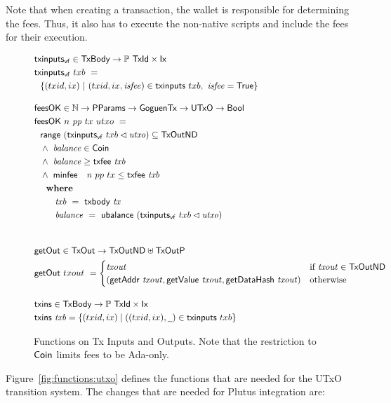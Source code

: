 Note that when creating a transaction, the wallet is responsible for
determining the fees. Thus, it also has to execute the non-native scripts
and include the fees for their execution.
\begin{figure}[htb]
  \begin{align*}
    & \fun{txinputs_{vf}} \in \TxBody \to \powerset{\TxId \times \Ix} \\
    & \fun{txinputs_{vf}} ~txb~= \\
    &~~\{ (txid,ix)~\vert~(txid,ix,\var{isfee}) \in
    \fun{txinputs} ~txb,~
     \var{isfee} = \True\}
    \nextdef
    & \fun{feesOK} \in \N \to \PParams \to \GoguenTx \to \UTxO \to \Bool  \\
    & \fun{feesOK} ~n~\var{pp}~tx~utxo~= \\
    &~~\fun{range}~(\fun{txinputs_{vf}}~{txb} \restrictdom \var{utxo}) \subseteq \TxOutND ~ \\
    &~~\wedge~ \var{balance} \in \Coin \\
    &~~      \wedge~ \var{balance} \geq \txfee{txb} ~ \\
    &~~      \wedge~ \minfee~n~{pp}~{tx} \leq \txfee{txb} \\
    &~~      \where \\
    & ~~~~~~~ \var{txb}~=~\txbody{tx} \\
    & ~~~~~~~ \var{balance}~=~\fun{ubalance}~(\fun{txinputs_{vf}}~{txb} \restrictdom \var{utxo}) \\
    \nextdef
    & \fun{getOut} \in \TxOut \to \TxOutND \uniondistinct \TxOutP \\
    & \fun{getOut} ~{txout}~= \begin{cases}
         \var{txout}  & \text{if~} \var{txout} \in \TxOutND \\
              (\fun{getAddr}~\var{txout}, \fun{getValue}~\var{txout},
              \fun{getDataHash}~\var{txout}) & \text{otherwise}
            \end{cases}
    \nextdef
    & \fun{txins} \in \TxBody \to \powerset{\TxId \times \Ix} \\
    & \fun{txins} ~\var{txb} = \{(txid,ix) \mid ((txid,ix),\wcard)\in\fun{txinputs} ~txb\}
  \end{align*}
  \caption{Functions on Tx Inputs and Outputs.  Note that the restriction to $\mathsf{Coin}$ limits fees to be Ada-only.}
  \label{fig:functions:insouts}
\end{figure}
%
Figure~\ref{fig:functions:utxo} defines the functions that are needed for the UTxO transition system.
The changes that are needed for Plutus integration are:

